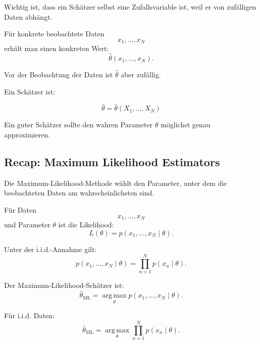 \documentclass[11pt,a4paper]{scrartcl}
\begin{document}
\begin{solutionbox}
    Wichtig ist, dass ein Schätzer selbst eine Zufallsvariable ist, weil er von
    zufälligen Daten abhängt.

    Für konkrete beobachtete Daten
    \[
        x_1,\dots,x_N
    \]
    erhält man einen konkreten Wert:
    \[
        \hat\theta(x_1,\dots,x_N).
    \]

    Vor der Beobachtung der Daten ist \(\hat\theta\) aber zufällig.
\end{solutionbox}

\begin{answerbox}
    Ein Schätzer ist:

    \[
        \boxed{
            \hat\theta
            =
            \hat\theta(X_1,\dots,X_N)
        }
    \]

    Ein guter Schätzer sollte den wahren Parameter \(\theta\) möglichst genau
    approximieren.
\end{answerbox}

\subsection{Recap: Maximum Likelihood Estimators}

\begin{notebox}
    Die Maximum-Likelihood-Methode wählt den Parameter, unter dem die
    beobachteten Daten am wahrscheinlichsten sind.

    Für Daten
    \[
        x_1,\dots,x_N
    \]
    und Parameter \(\theta\) ist die Likelihood:
    \[
        L(\theta)
        =
        p(x_1,\dots,x_N \mid \theta).
    \]
\end{notebox}

\begin{calculationbox}
    Unter der i.i.d.-Annahme gilt:
    \[
        p(x_1,\dots,x_N \mid \theta)
        =
        \prod_{n=1}^{N}
        p(x_n \mid \theta).
    \]

    Der Maximum-Likelihood-Schätzer ist:
    \[
        \hat\theta_{\mathrm{ML}}
        =
        \operatorname*{arg\,max}_{\theta}
        p(x_1,\dots,x_N \mid \theta).
    \]

    Für i.i.d. Daten:
    \[
        \hat\theta_{\mathrm{ML}}
        =
        \operatorname*{arg\,max}_{\theta}
        \prod_{n=1}^{N}
        p(x_n \mid \theta).
    \]
\end{calculationbox}
\end{document}
